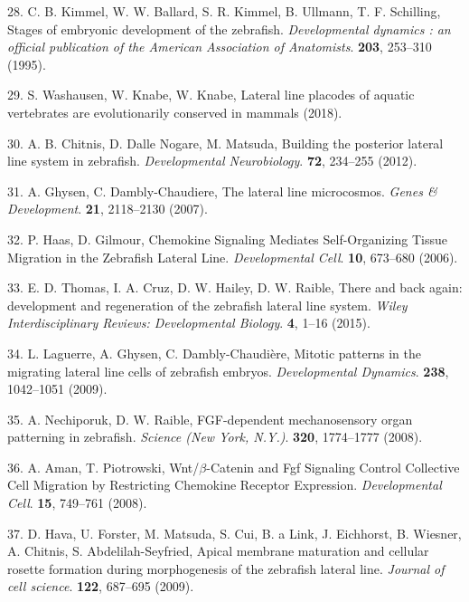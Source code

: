 \documentclass[11pt,singlespacinge,twoside]{reedthesis} %
\theoremstyle{definition}
\theoremstyle{definition}
\theoremstyle{definition}
\theoremstyle{remark}
\begin{document}
\leavevmode\hypertarget{ref-Kimmel1995a}{}%
28. C. B. Kimmel, W. W. Ballard, S. R. Kimmel, B. Ullmann, T. F. Schilling, Stages of embryonic development of the zebrafish. \emph{Developmental dynamics : an official publication of the American Association of Anatomists}. \textbf{203}, 253--310 (1995).

\leavevmode\hypertarget{ref-Washausen2018}{}%
29. S. Washausen, W. Knabe, W. Knabe, Lateral line placodes of aquatic vertebrates are evolutionarily conserved in mammals (2018).

\leavevmode\hypertarget{ref-Chitnis2012a}{}%
30. A. B. Chitnis, D. Dalle Nogare, M. Matsuda, Building the posterior lateral line system in zebrafish. \emph{Developmental Neurobiology}. \textbf{72}, 234--255 (2012).

\leavevmode\hypertarget{ref-Ghysen2007a}{}%
31. A. Ghysen, C. Dambly-Chaudiere, The lateral line microcosmos. \emph{Genes \& Development}. \textbf{21}, 2118--2130 (2007).

\leavevmode\hypertarget{ref-Haas2006c}{}%
32. P. Haas, D. Gilmour, Chemokine Signaling Mediates Self-Organizing Tissue Migration in the Zebrafish Lateral Line. \emph{Developmental Cell}. \textbf{10}, 673--680 (2006).

\leavevmode\hypertarget{ref-Harding2014a}{}%
33. E. D. Thomas, I. A. Cruz, D. W. Hailey, D. W. Raible, There and back again: development and regeneration of the zebrafish lateral line system. \emph{Wiley Interdisciplinary Reviews: Developmental Biology}. \textbf{4}, 1--16 (2015).

\leavevmode\hypertarget{ref-Laguerre2009a}{}%
34. L. Laguerre, A. Ghysen, C. Dambly-Chaudière, Mitotic patterns in the migrating lateral line cells of zebrafish embryos. \emph{Developmental Dynamics}. \textbf{238}, 1042--1051 (2009).

\leavevmode\hypertarget{ref-Nechiporuk2008}{}%
35. A. Nechiporuk, D. W. Raible, FGF-dependent mechanosensory organ patterning in zebrafish. \emph{Science (New York, N.Y.)}. \textbf{320}, 1774--1777 (2008).

\leavevmode\hypertarget{ref-Aman2008}{}%
36. A. Aman, T. Piotrowski, Wnt/\(\beta\)-Catenin and Fgf Signaling Control Collective Cell Migration by Restricting Chemokine Receptor Expression. \emph{Developmental Cell}. \textbf{15}, 749--761 (2008).

\leavevmode\hypertarget{ref-Hava2009}{}%
37. D. Hava, U. Forster, M. Matsuda, S. Cui, B. a Link, J. Eichhorst, B. Wiesner, A. Chitnis, S. Abdelilah-Seyfried, Apical membrane maturation and cellular rosette formation during morphogenesis of the zebrafish lateral line. \emph{Journal of cell science}. \textbf{122}, 687--695 (2009).
\end{document}
